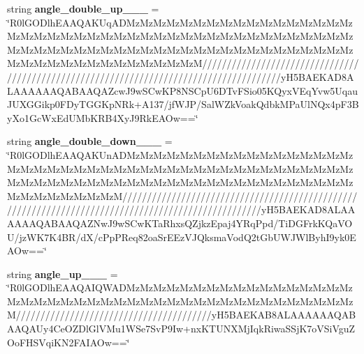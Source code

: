 \begin{DoxyCompactItemize}
string {\bfseries angle\+\_\+double\+\_\+up\+\_\+\_\+\_} = \char`\"{}R0l\+G\+O\+Dlh\+E\+A\+A\+Q\+A\+K\+Uq\+A\+D\+Mz\+Mz\+Mz\+Mz\+Mz\+Mz\+Mz\+Mz\+Mz\+Mz\+Mz\+Mz\+Mz\+Mz\+Mz\+Mz\+Mz\+Mz\+Mz\+Mz\+Mz\+Mz\+Mz\+Mz\+Mz\+Mz\+Mz\+Mz\+Mz\+Mz\+Mz\+Mz\+Mz\+Mz\+Mz\+Mz\+Mz\+Mz\+Mz\+Mz\+Mz\+Mz\+Mz\+Mz\+Mz\+Mz\+Mz\+Mz\+Mz\+Mz\+Mz\+Mz\+Mz\+Mz\+Mz\+Mz\+Mz\+Mz\+Mz\+Mz\+Mz\+Mz\+Mz\+Mz\+Mz\+Mz\+Mz\+Mz\+Mz\+Mz\+Mz\+Mz\+Mz\+Mz\+Mz\+Mz\+Mz\+Mz\+Mz\+Mz\+Mz\+Mz\+MzM////////////////////////////////////////////////////////////////////////////////////////y\+H5\+B\+A\+E\+K\+A\+D8\+A\+L\+A\+A\+A\+A\+A\+A\+Q\+A\+B\+A\+A\+Q\+A\+Zcw\+J9w\+S\+Cw\+K\+P8\+N\+S\+Cp\+U6\+D\+Tv\+F\+Sio05\+K\+Qyx\+V\+Eq\+Yvw5\+Uqau\+J\+U\+X\+G\+Gikp0\+F\+Dy\+T\+G\+G\+Kp\+N\+Rk+A137/jf\+W\+JP/Sal\+W\+Zk\+Voak\+Qdbk\+M\+Pa\+Ul\+N\+Qx4p\+F3\+By\+Xo1\+Gc\+Wx\+Ed\+U\+Mb\+K\+R\+B4\+Xy\+J9\+Rk\+E\+A\+Ow==\char`\"{}
\item 
\mbox{\label{class_c_utils_1_1_utils_1_1_resources_1_1_icons_a2d168ca7b55270d71ef0f1d45263e5ff}} 
string {\bfseries angle\+\_\+double\+\_\+down\+\_\+\_\+\_} = \char`\"{}R0l\+G\+O\+Dlh\+E\+A\+A\+Q\+A\+K\+Un\+A\+D\+Mz\+Mz\+Mz\+Mz\+Mz\+Mz\+Mz\+Mz\+Mz\+Mz\+Mz\+Mz\+Mz\+Mz\+Mz\+Mz\+Mz\+Mz\+Mz\+Mz\+Mz\+Mz\+Mz\+Mz\+Mz\+Mz\+Mz\+Mz\+Mz\+Mz\+Mz\+Mz\+Mz\+Mz\+Mz\+Mz\+Mz\+Mz\+Mz\+Mz\+Mz\+Mz\+Mz\+Mz\+Mz\+Mz\+Mz\+Mz\+Mz\+Mz\+Mz\+Mz\+Mz\+Mz\+Mz\+Mz\+Mz\+Mz\+Mz\+Mz\+Mz\+Mz\+Mz\+Mz\+Mz\+Mz\+Mz\+Mz\+Mz\+Mz\+Mz\+Mz\+Mz\+Mz\+Mz\+Mz\+MzM////////////////////////////////////////////////////////////////////////////////////////////////////y\+H5\+B\+A\+E\+K\+A\+D8\+A\+L\+A\+A\+A\+A\+A\+A\+Q\+A\+B\+A\+A\+Q\+A\+Z\+Nw\+J9w\+S\+Cw\+K\+Ta\+Rhxs\+Q\+Zjkz\+Epaj4\+Y\+Rq\+Ppd/Ti\+D\+G\+Frk\+K\+Qa\+V\+OU/jz\+W\+K7\+K4\+BR/dX/c\+Pp\+P\+Req82oa\+Sr\+E\+Ez\+V\+J\+Qksma\+Vod\+Q2t\+Gb\+U\+W\+J\+Wl\+Byh\+I9yk0\+E\+A\+Ow==\char`\"{}
\item 
\mbox{\label{class_c_utils_1_1_utils_1_1_resources_1_1_icons_a544a4512bb037c433071a6012e9ffe28}} 
string {\bfseries angle\+\_\+up\+\_\+\_\+\_} = \char`\"{}R0l\+G\+O\+Dlh\+E\+A\+A\+Q\+A\+I\+Q\+W\+A\+D\+Mz\+Mz\+Mz\+Mz\+Mz\+Mz\+Mz\+Mz\+Mz\+Mz\+Mz\+Mz\+Mz\+Mz\+Mz\+Mz\+Mz\+Mz\+Mz\+Mz\+Mz\+Mz\+Mz\+Mz\+Mz\+Mz\+Mz\+Mz\+Mz\+Mz\+Mz\+Mz\+Mz\+Mz\+Mz\+Mz\+Mz\+Mz\+Mz\+Mz\+Mz\+Mz\+MzM////////////////////////////////////////y\+H5\+B\+A\+E\+K\+A\+B8\+A\+L\+A\+A\+A\+A\+A\+A\+Q\+A\+B\+A\+A\+Q\+A\+Uy4\+Ce\+O\+Z\+Dl\+Gl\+V\+Mu1\+W\+Se7\+Sv\+P9\+Iw+nx\+K\+T\+U\+N\+X\+Mj\+Iqk\+Riwa\+S\+Sj\+K7o\+V\+Si\+Vgu\+Z\+Oo\+F\+H\+S\+Vqi\+K\+N2\+F\+A\+I\+A\+Ow==\char`\"{}

\end{DoxyCompactItemize}
